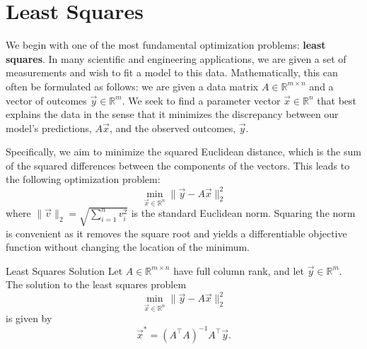 \documentclass{article}
\begin{document}
\section*{Least Squares}
\begin{Exposition}
  We begin with one of the most fundamental optimization problems: \textbf{least squares}. In many scientific and engineering applications, we are given a set of measurements and wish to fit a model to this data. Mathematically, this can often be formulated as follows: we are given a data matrix $A \in \mathbb{R}^{m \times n}$ and a vector of outcomes $\vec{y} \in \mathbb{R}^m$. We seek to find a parameter vector $\vec{x} \in \mathbb{R}^n$ that best explains the data in the sense that it minimizes the discrepancy between our model's predictions, $A\vec{x}$, and the observed outcomes, $\vec{y}$.

  Specifically, we aim to minimize the squared Euclidean distance, which is the sum of the squared differences between the components of the vectors. This leads to the following optimization problem:
  $$
  \min_{\vec{x} \in \mathbb{R}^n} \|\vec{y} - A\vec{x}\|_2^2
  $$
  where $\|\vec{v}\|_2 = \sqrt{\sum_{i=1}^n v_i^2}$ is the standard Euclidean norm. Squaring the norm is convenient as it removes the square root and yields a differentiable objective function without changing the location of the minimum.
\end{Exposition}
\begin{Theorem}{Least Squares Solution}
  Let $A \in \mathbb{R}^{m \times n}$ have full column rank, and let $\vec{y} \in \mathbb{R}^m$. The solution to the least squares problem
  $$ \min_{\vec{x} \in \mathbb{R}^n} \|\vec{y} - A\vec{x}\|_2^2 $$
  is given by
  $$ \vec{x}^* = (A^\top A)^{-1} A^\top \vec{y}. $$
\end{Theorem}
\end{document}
